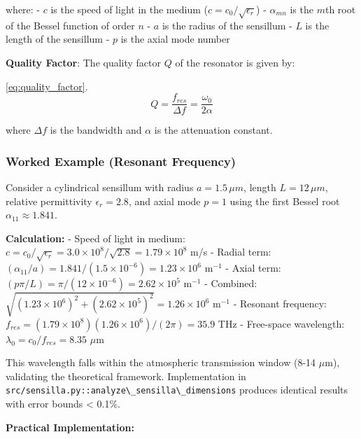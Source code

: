 \documentclass[
  13pt,
  a4paperpaper,
  12pt]{article}
\newcommand{\passthrough}[1]{#1}
\begin{document}
where: - \(c\) is the speed of light in the medium
(\(c = c_0/\sqrt{\epsilon_r}\)) - \(\alpha_{mn}\) is the \(m\)th root of
the Bessel function of order \(n\) - \(a\) is the radius of the
sensillum - \(L\) is the length of the sensillum - \(p\) is the axial
mode number

\textbf{Quality Factor}: The quality factor \(Q\) of the resonator is
given by:

\eqref{eq:quality_factor}. \begin{equation}
Q = \frac{f_{res}}{\Delta f} = \frac{\omega_0}{2\alpha} \label{eq:quality_factor}
\end{equation}

where \(\Delta f\) is the bandwidth and \(\alpha\) is the attenuation
constant.

\subsubsection{Worked Example (Resonant
Frequency)}\label{worked-example-resonant-frequency}

Consider a cylindrical sensillum with radius \(a=1.5\,\mu m\), length
\(L=12\,\mu m\), relative permittivity \(\epsilon_r=2.8\), and axial
mode \(p=1\) using the first Bessel root \(\alpha_{11}\approx1.841\).

\textbf{Calculation:} - Speed of light in medium:
\(c = c_0/\sqrt{\epsilon_r} = 3.0 \times 10^8 / \sqrt{2.8} = 1.79 \times 10^8\)
m/s - Radial term:
\((\alpha_{11}/a) = 1.841/(1.5 \times 10^{-6}) = 1.23 \times 10^6\)
m\(^{-1}\) - Axial term:
\((p\pi/L) = \pi/(12 \times 10^{-6}) = 2.62 \times 10^5\) m\(^{-1}\) -
Combined:
\(\sqrt{(1.23 \times 10^6)^2 + (2.62 \times 10^5)^2} = 1.26 \times 10^6\)
m\(^{-1}\) - Resonant frequency:
\(f_{res} = (1.79 \times 10^8)(1.26 \times 10^6)/(2\pi) = 35.9\) THz -
Free-space wavelength: \(\lambda_0 = c_0/f_{res} = 8.35\)
\(\mu\mathrm{m}\)

This wavelength falls within the atmospheric transmission window (8-14
\(\mu\mathrm{m}\)), validating the theoretical framework. Implementation
in
\passthrough{\lstinline!src/sensilla.py::analyze\_sensilla\_dimensions!}
produces identical results with error bounds \textless{} 0.1\%.

\textbf{Practical Implementation:}
\end{document}
